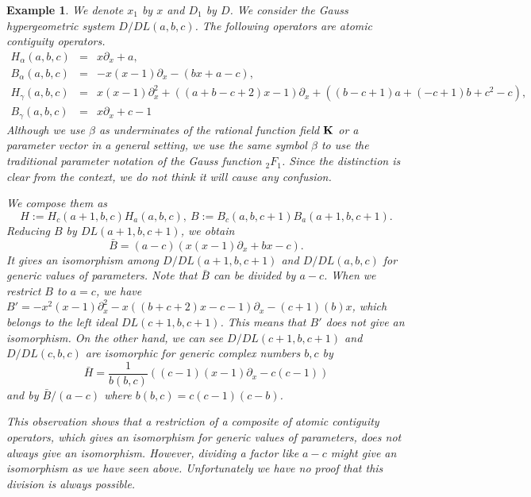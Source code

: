 \documentclass{article}
\def\aa{a}
\def\bb{b}
\def\cc{c}
\def\KK{{\bf K}}
\def\pd#1{\partial_{#1}}
\newtheorem{example}{Example}
\begin{document}
\begin{example}\rm \label{ex:rest_of_isom_does_not_give_isom}
We denote $x_1$ by $x$ and $D_1$ by $D$.
We consider the Gauss hypergeometric system
$D/DL(\aa,\bb,\cc)$.
The following operators are atomic contiguity operators.
\begin{eqnarray}
H_\alpha(\aa,\bb,\cc)&=&  {x}\pd{x} +  {\aa }, \\
B_\alpha(\aa,\bb,\cc)&=&    -  {x}  (  {x}- 1)\pd{x}
  -   (    {\bb }  {x}+ {\aa }- {\cc }), \\
H_\gamma(\aa,\bb,\cc)&=&  {x}  (  {x}- 1)\pd{x}^{2}
 +  (   (    {\aa }+ {\bb }- {\cc }+ 2)  {x}- 1)\pd{x}
 +  (     (   {\bb }- {\cc }+ 1)  {\aa }+  (  - {\cc }+ 1)  {\bb }+  {\cc }^{ 2} - {\cc }), \\
B_\gamma(\aa,\bb,\cc)&=& {x}\pd{x} +  {\cc }- 1
\end{eqnarray}
Although we use $\beta$ as underminates of the rational function field $\KK$ or a parameter vector in a general setting,
we use the same symbol $\beta$ to use the traditional
parameter notation of the Gauss function ${}_2F_1$.
Since the distinction is clear from the context, we do not think it will cause any confusion.

We compose them as 
$$ 
   H:=H_\cc(\aa+1,\bb,\cc) H_\aa(\aa,\bb,\cc), \    
   B:=B_\cc(\aa,\bb,\cc+1) B_\aa(\aa+1,\bb,\cc+1). 
$$
Reducing $B$ by $DL(\aa+1,\bb,\cc+1)$, we obtain
\begin{equation} \label{eq:isom-B-gauss1}
{\bar B}=
(  {\aa }- {\cc })   ({x}  (  {x}- 1)\pd{x}
 +   {\bb }  {x}- {\cc }). 
\end{equation}
It gives an isomorphism among
$D/DL(\aa+1,\bb,\cc+1)$ and
$D/DL(\aa,\bb,\cc)$ for generic values of
parameters.
Note that ${\bar B}$ can be divided by $\aa-\cc$. 
When we restrict $B$ to $\aa=\cc$,
we have
$B'=    -  {x}^{ 2}   (  {x}- 1)\pd{x}^{2}
  -    {x}  (    (   {\bb }+ {\cc }+ 2)  {x}- {\cc }- 1)\pd{x}
  -   (  {\cc }+ 1)  ( {\bb }) {x}
$,
which belongs to the left ideal $DL(\cc+1,\bb,\cc+1)$.
This means that $B'$ does not give an isomorphism.
On the other hand, we can see
$D/DL(\cc+1,\bb,\cc+1)$
and
$D/DL(\cc,\bb,\cc)$
are isomorphic
for generic complex numbers $\bb, \cc$
by 
\begin{equation} \label{eq:gauss-h-isom1}
{\bar H}=
  \frac{1}{b(\bb,\cc)} \left( (  {\cc }- 1)  (  {x}- 1)\pd{x}
  -   {\cc }  (  {\cc }- 1) \right)
\end{equation}
and
by ${\bar B}/(\aa-\cc)$
where $b(\bb,\cc)=\cc(\cc-1)(\cc-\bb)$.

This observation shows that a restriction 
of a composite of atomic contiguity operators, 
which gives an isomorphism
for generic values of parameters,
does not always give an isomorphism.
However, dividing a factor like $\aa-\cc$ might
give an isomorphism as we have seen above.
Unfortunately we have no proof that this division
is always possible.
\end{example}
\end{document}
